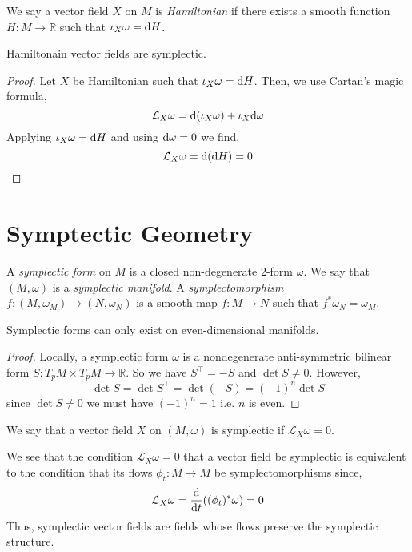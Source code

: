 \documentclass[12pt]{extarticle}
\renewcommand{\L}{\mathcal{L}}
\newcommand{\R}{\mathbb{R}}
\begin{document}
\begin{defn}
We say a vector field $X$ on $M$ is \textit{Hamiltonian} if there exists a smooth function $H : M \to \R$ such that $\iota_X \omega = \mathrm{d}{H}$. 
\end{defn}

\begin{lemma}
Hamiltonain vector fields are symplectic.
\end{lemma}

\begin{proof}
Let $X$ be Hamiltonian such that $\iota_X \omega = \mathrm{d}{H}$. Then, we use Cartan's magic formula,
\[ \L_X \omega = \d (\iota_X \omega) + \iota_X \d \omega \]
Applying $\iota_X \omega = \mathrm{d}{H}$ and using $\mathrm{d}{\omega} = 0$ we find,
\[ \L_X \omega = \d(\d{H}) = 0 \]
\end{proof}

\section{Symptectic Geometry}

\begin{definition}
A \textit{symplectic form} on $M$ is a closed non-degenerate $2$-form $\omega$. We say that $(M, \omega)$ is a \textit{symplectic manifold}. A \textit{symplectomorphism} $f : (M, \omega_M) \to (N, \omega_N)$ is a smooth map $f : M \to N$ such that $f^* \omega_N = \omega_M$. 
\end{definition}

\begin{lemma}
Symplectic forms can only exist on even-dimensional manifolds. 
\end{lemma}

\begin{proof}
Locally, a symplectic form $\omega$ is a nondegenerate anti-symmetric bilinear form $S : T_p M \times T_p M \to \R$. So we have $S^\top = - S$ and $\det{S} \neq 0$. However, \[ \det{S} = \det{S^\top} = \det{(- S)} = (-1)^n \det{S} \]
since $\det{S} \neq 0$ we must have $(-1)^n = 1$ i.e. $n$ is even.
\end{proof}

\begin{definition}
We say that a vector field $X$ on $(M, \omega)$ is symplectic if $\L_X \omega = 0$.
\end{definition}

\begin{remark}
We see that the condition $\L_X \omega = 0$ that a vector field be symplectic is equivalent to the condition that its flows $\phi_t :  M \to M$ be symplectomorphisms since,
\[ \L_X \omega = \deriv{}{t} ((\phi_t)^* \omega) = 0 \]
Thus, symplectic vector fields are fields whose flows preserve the symplectic structure.
\end{remark}
\end{document}
